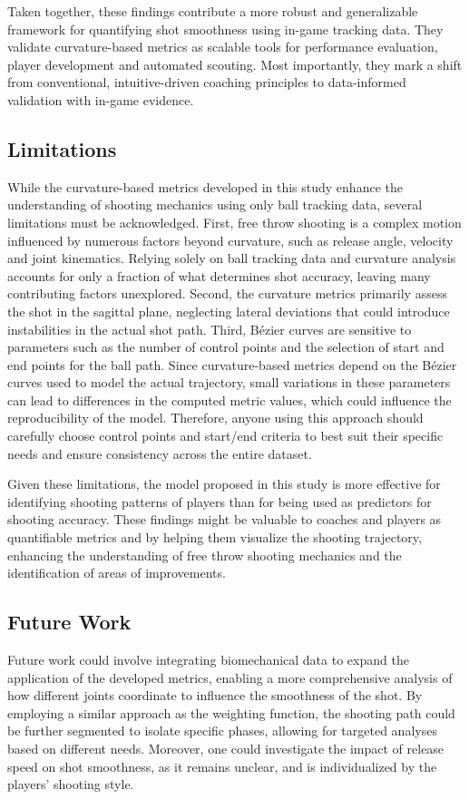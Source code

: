 \documentclass{article}
\begin{document}
      Taken together, these findings contribute a more robust and generalizable framework for quantifying shot smoothness using in-game tracking data. They validate curvature-based metrics as scalable tools for performance evaluation, player development and automated scouting. Most importantly, they mark a shift from conventional, intuitive-driven coaching principles to data-informed validation with in-game evidence.

    \subsection{Limitations}

      While the curvature-based metrics developed in this study enhance the understanding of shooting mechanics using only ball tracking data, several limitations must be acknowledged. First, free throw shooting is a complex motion influenced by numerous factors beyond curvature, such as release angle, velocity and joint kinematics. Relying solely on ball tracking data and curvature analysis accounts for only a fraction of what determines shot accuracy, leaving many contributing factors unexplored. Second, the curvature metrics primarily assess the shot in the sagittal plane, neglecting lateral deviations that could introduce instabilities in the actual shot path. Third, Bézier curves are sensitive to parameters such as the number of control points and the selection of start and end points for the ball path. Since curvature-based metrics depend on the Bézier curves used to model the actual trajectory, small variations in these parameters can lead to differences in the computed metric values, which could influence the reproducibility of the model. Therefore, anyone using this approach should carefully choose control points and start/end criteria to best suit their specific needs and ensure consistency across the entire dataset.

      Given these limitations, the model proposed in this study is more effective for identifying shooting patterns of players than for being used as predictors for shooting accuracy. These findings might be valuable to coaches and players as quantifiable metrics and by helping them visualize the shooting trajectory, enhancing the understanding of free throw shooting mechanics and the identification of areas of improvements.

    \subsection{Future Work}
    
      Future work could involve integrating biomechanical data to expand the application of the developed metrics, enabling a more comprehensive analysis of how different joints coordinate to influence the smoothness of the shot. By employing a similar approach as the weighting function, the shooting path could be further segmented to isolate specific phases, allowing for targeted analyses based on different needs. Moreover, one could investigate the impact of release speed on shot smoothness, as it remains unclear, and is individualized by the players' shooting style.  

  
\end{document}
